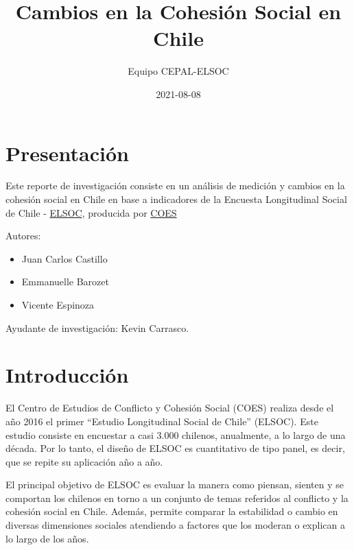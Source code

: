 \documentclass[
  12pt,
]{book}
\title{Cambios en la Cohesión Social en Chile}
\author{Equipo CEPAL-ELSOC}
\date{2021-08-08}
\providecommand{\tightlist}{%
  \setlength{\itemsep}{0pt}\setlength{\parskip}{0pt}}
\begin{document}
\maketitle

{
\hypersetup{linkcolor=}
\setcounter{tocdepth}{1}
\tableofcontents
}
\listoftables
\listoffigures
{}
\hypertarget{presentaciuxf3n}{%
\chapter*{Presentación}\label{presentaciuxf3n}}

Este reporte de investigación consiste en un análisis de medición y cambios en la cohesión social en Chile en base a indicadores de la Encuesta Longitudinal Social de Chile - \href{https://coes.cl/encuesta-panel/}{ELSOC}, producida por \href{https://coes.cl/}{COES}

Autores:

\begin{itemize}
\tightlist
\item
  Juan Carlos Castillo
\item
  Emmanuelle Barozet
\item
  Vicente Espinoza
\end{itemize}

Ayudante de investigación: Kevin Carrasco.

\hypertarget{introducciuxf3n}{%
\chapter*{Introducción}\label{introducciuxf3n}}

El Centro de Estudios de Conflicto y Cohesión Social (COES) realiza desde el año 2016 el primer ``Estudio Longitudinal Social de Chile'' (ELSOC). Este estudio consiste en encuestar a casi 3.000 chilenos, anualmente, a lo largo de una década. Por lo tanto, el diseño de ELSOC es cuantitativo de tipo panel, es decir, que se repite su aplicación año a año.

El principal objetivo de ELSOC es evaluar la manera como piensan, sienten y se comportan los chilenos en torno a un conjunto de temas referidos al conflicto y la cohesión social en Chile. Además, permite comparar la estabilidad o cambio en diversas dimensiones sociales atendiendo a factores que los moderan o explican a lo largo de los años.
\end{document}
